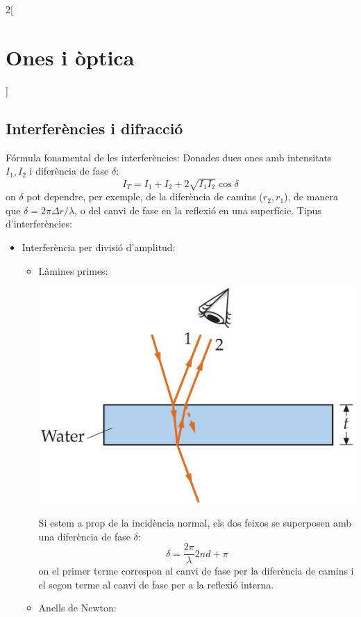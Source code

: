 \documentclass[../../../main.tex]{subfiles}
\begin{document}
\begin{multicols}{2}[\section{Ones i òptica}]
  \subsection{Interferències i difracció}
  Fórmula fonamental de les interferències: Donades dues ones amb intensitats $I_1,I_2$ i diferència de fase $\delta$: $$I_T=I_1+I_2+2\sqrt{I_1I_2}\cos\delta$$
  {\footnotesize on $\delta$ pot dependre, per exemple, de la diferència de camins ($r_2,r_1$), de manera que $\delta=2\pi\Delta r/\lambda$, o del canvi de fase en la reflexió en una superfície.}\newline
  Tipus d'interferències:
  \begin{itemize}
    \item Interferència per divisió d'amplitud:
          \begin{itemize}
            \item Làmines primes:\newline
                  \begin{minipage}{\linewidth}
                    \centering \includegraphics[width=\linewidth]{Physics/1st/Waves_and_optics/Images/lamprim.jpg}
                  \end{minipage}
                  Si estem a prop de la incidència normal, els dos feixos se superposen amb una diferència de fase $\delta$: $$\delta=\frac{2\pi}{\lambda}2nd+\pi$$ {\footnotesize on el primer terme correspon al canvi de fase per la diferència de camins i el segon terme al canvi de fase per a la reflexió interna.}
            \item Anells de Newton:\newline

\end{itemize}
\end{itemize}
\end{multicols}
\end{document}
